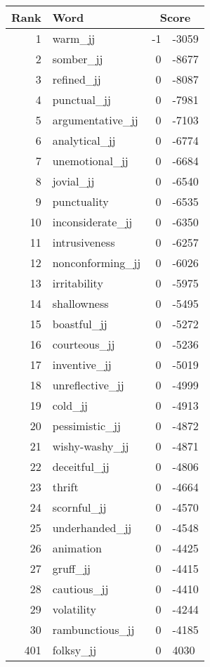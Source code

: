 \begin{longtable}[!htbp]{| rlr@{.}l |}
    \hline
    \textbf{Rank} & \textbf{Word} & \multicolumn{2}{c|}{\textbf{Score}} \\
    \hline
    \endhead
    1 & warm\_jj & -1 & -3059 \\
    2 & somber\_jj & 0 & -8677 \\
    3 & refined\_jj & 0 & -8087 \\
    4 & punctual\_jj & 0 & -7981 \\
    5 & argumentative\_jj & 0 & -7103 \\
    6 & analytical\_jj & 0 & -6774 \\
    7 & unemotional\_jj & 0 & -6684 \\
    8 & jovial\_jj & 0 & -6540 \\
    9 & punctuality & 0 & -6535 \\
    10 & inconsiderate\_jj & 0 & -6350 \\
    11 & intrusiveness & 0 & -6257 \\
    12 & nonconforming\_jj & 0 & -6026 \\
    13 & irritability & 0 & -5975 \\
    14 & shallowness & 0 & -5495 \\
    15 & boastful\_jj & 0 & -5272 \\
    16 & courteous\_jj & 0 & -5236 \\
    17 & inventive\_jj & 0 & -5019 \\
    18 & unreflective\_jj & 0 & -4999 \\
    19 & cold\_jj & 0 & -4913 \\
    20 & pessimistic\_jj & 0 & -4872 \\
    21 & wishy-washy\_jj & 0 & -4871 \\
    22 & deceitful\_jj & 0 & -4806 \\
    23 & thrift & 0 & -4664 \\
    24 & scornful\_jj & 0 & -4570 \\
    25 & underhanded\_jj & 0 & -4548 \\
    26 & animation & 0 & -4425 \\
    27 & gruff\_jj & 0 & -4415 \\
    28 & cautious\_jj & 0 & -4410 \\
    29 & volatility & 0 & -4244 \\
    30 & rambunctious\_jj & 0 & -4185 \\
    401 & folksy\_jj & 0 & 4030 \\

\end{longtable}
